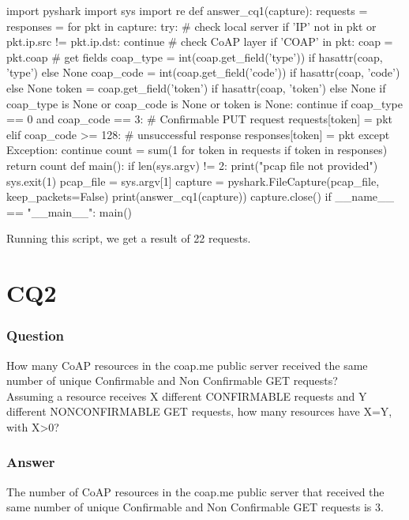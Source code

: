 \begin{python}
import pyshark
import sys
import re
def answer_cq1(capture):
    requests = {}
    responses = {}
    for pkt in capture:
        try:
            # check local server 
            if 'IP' not in pkt or pkt.ip.src != pkt.ip.dst:
                continue
            # check CoAP layer
            if 'COAP' in pkt:
                coap = pkt.coap
                # get fields 
                coap_type = int(coap.get_field('type')) if hasattr(coap, 'type') else None
                coap_code = int(coap.get_field('code')) if hasattr(coap, 'code') else None
                token = coap.get_field('token') if hasattr(coap, 'token') else None
                if coap_type is None or coap_code is None or token is None:
                    continue
                if coap_type == 0 and coap_code == 3:
                    # Confirmable PUT request 
                    requests[token] = pkt
                elif coap_code >= 128:
                    # unsuccessful response  
                    responses[token] = pkt
        except Exception:
            continue
    count = sum(1 for token in requests if token in responses)
    return count
def main():
    if len(sys.argv) != 2:
        print("pcap file not provided")
        sys.exit(1)
    pcap_file = sys.argv[1]
    capture = pyshark.FileCapture(pcap_file, keep_packets=False)    
    print(answer_cq1(capture))
    capture.close()
if __name__ == "__main__":
    main()
\end{python}

Running this script, we get a result of 22 requests.

\section{CQ2}
\subsubsection{Question}
How many CoAP resources in the coap.me public server received the same number of unique Confirmable and Non Confirmable GET requests?\\
Assuming a resource receives X different CONFIRMABLE requests and Y different NONCONFIRMABLE GET requests, how many resources have X=Y, with X>0?

\subsubsection{Answer}
The number of CoAP resources in the coap.me public server that received the same number of unique Confirmable and Non Confirmable GET requests is 3.

